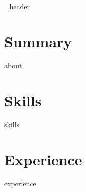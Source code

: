 \documentclass[letterpaper,11pt]{article}
\begin{document}
{_header}\label{sec:header}

\vspace*{4pt}

\section{Summary}\label{sec:about}
\vspace*{4pt}
{about}
\vspace*{2pt}

\section{Skills}\label{sec:skills}
\vspace*{4pt}
{skills}
\vspace*{2pt}

\section{Experience}\label{sec:experience}
\vspace*{8pt}
{experience}
\end{document}
